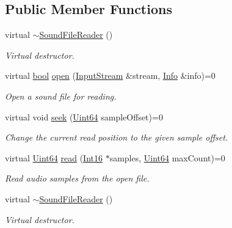 \subsection*{Public Member Functions}
\begin{DoxyCompactItemize}
\item 
virtual \hyperlink{classsf_1_1_sound_file_reader_a34163297f302d15818c76b54f815acc8}{$\sim$\-Sound\-File\-Reader} ()
\begin{DoxyCompactList}\small\item\em Virtual destructor. \end{DoxyCompactList}\item 
virtual \hyperlink{term__entry_8h_a002004ba5d663f149f6c38064926abac}{bool} \hyperlink{classsf_1_1_sound_file_reader_aa1d2fee2ba8f359c833ab74590d55935}{open} (\hyperlink{classsf_1_1_input_stream}{Input\-Stream} \&stream, \hyperlink{structsf_1_1_sound_file_reader_1_1_info}{Info} \&info)=0
\begin{DoxyCompactList}\small\item\em Open a sound file for reading. \end{DoxyCompactList}\item 
virtual void \hyperlink{classsf_1_1_sound_file_reader_a1e18ade5ffe882bdfa20a2ebe7e2b015}{seek} (\hyperlink{namespacesf_add9ac83466d96b9f50a009b9f4064266}{Uint64} sample\-Offset)=0
\begin{DoxyCompactList}\small\item\em Change the current read position to the given sample offset. \end{DoxyCompactList}\item 
virtual \hyperlink{namespacesf_add9ac83466d96b9f50a009b9f4064266}{Uint64} \hyperlink{classsf_1_1_sound_file_reader_a3b7d86769ea07e24e7b0f0486bed7591}{read} (\hyperlink{namespacesf_a3c8e10435e2a310a7741755e66b5c94e}{Int16} $\ast$samples, \hyperlink{namespacesf_add9ac83466d96b9f50a009b9f4064266}{Uint64} max\-Count)=0
\begin{DoxyCompactList}\small\item\em Read audio samples from the open file. \end{DoxyCompactList}\item 
virtual \hyperlink{classsf_1_1_sound_file_reader_a34163297f302d15818c76b54f815acc8}{$\sim$\-Sound\-File\-Reader} ()
\begin{DoxyCompactList}\small\item\em Virtual destructor. \end{DoxyCompactList}\item 

\end{DoxyCompactItemize}
